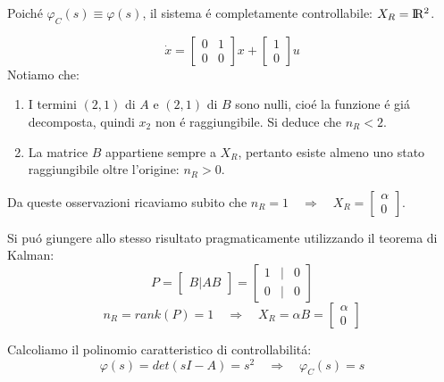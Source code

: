 \documentclass[../main.tex]{subfiles}
\begin{document}
\begin{mdframed}[style=Exercise]
\begin{Exercise}[title={Calcolare $ X_R $ e $ \varphi_C(s) $}, difficulty=1]
\begin{itemize}
						Poich\'e $ \varphi_C(s) \equiv \varphi(s) $, il sistema \'e completamente controllabile: $ X_R = \rm I\!R^2 $.
				\end{itemize}
			\end{Exercise}
		\end{mdframed}
	
		\begin{mdframed}[style=Exercise]
			\begin{Exercise}[title={Calcolare $ X_R $ e $ \varphi_C(s) $}, difficulty=1]
				\[
					\dot x =
					\begin{bmatrix}
						0 & 1\\
						0 & 0
					\end{bmatrix} x+
					\begin{bmatrix}
						1\\
						0
					\end{bmatrix} u
				\]
				Notiamo che:
				\begin{enumerate}
					\item
						I termini $ (2,1) $ di $ A $ e $ (2,1) $ di $ B $ sono nulli, cio\'e la funzione \'e gi\'a decomposta, quindi $ x_2 $ non \'e raggiungibile. Si deduce che $ n_R < 2 $.
					\item
						La matrice $ B $ appartiene sempre a $ X_R $, pertanto esiste almeno uno stato raggiungibile oltre l'origine: $ n_R > 0 $.
				\end{enumerate}
			
				Da queste osservazioni ricaviamo subito che $ n_R = 1 \quad\Rightarrow\quad X_R = \begin{bmatrix} \alpha\\ 0 \end{bmatrix} $.
				
				Si pu\'o giungere allo stesso risultato pragmaticamente utilizzando il teorema di Kalman:
				\[
					P =
					\begin{bmatrix}
						B | AB
					\end{bmatrix} =
					\begin{bmatrix}
						1 & | & 0\\
						0 & | & 0
					\end{bmatrix}
				\]
				\[
					n_R = rank\left( P \right) = 1 \quad\Rightarrow\quad X_R = \alpha B =
					\begin{bmatrix}
						\alpha\\
						0
					\end{bmatrix}
				\]
				
				Calcoliamo il polinomio caratteristico di controllabilit\'a:
				\[
					\varphi(s) = det(sI-A) = s^2 \quad\Rightarrow\quad \varphi_C(s) = s
				\]
			\end{Exercise}
		\end{mdframed}
\end{document}
